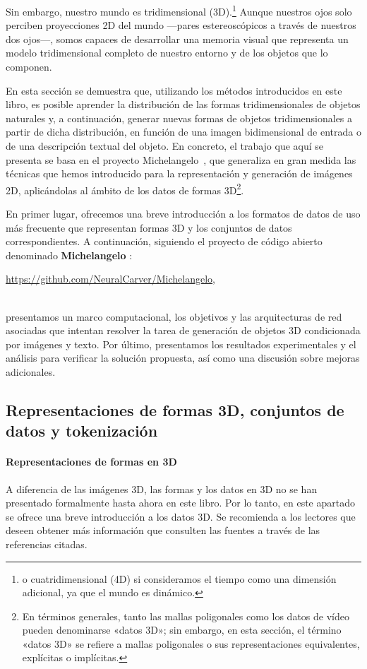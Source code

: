 \documentclass[../../book-main_es.tex]{subfiles}
\begin{document}
Sin embargo, nuestro mundo es tridimensional (3D).\footnote{o
cuatridimensional (4D) si consideramos el tiempo como una dimensión adicional, ya que
el mundo es dinámico.} Aunque nuestros ojos solo perciben proyecciones 2D
del mundo ---pares estereoscópicos a través de nuestros dos ojos---, somos
capaces de desarrollar una memoria visual que representa un modelo tridimensional completo
de nuestro entorno y de los objetos que lo componen.

En esta sección se demuestra que, utilizando los métodos introducidos en este
libro, es posible aprender la distribución de las formas tridimensionales de
objetos naturales y, a continuación, generar nuevas formas de objetos tridimensionales a partir de dicha
distribución, en función de una imagen bidimensional de entrada o de una descripción
textual del objeto. En concreto, el trabajo que aquí se presenta se
basa en el proyecto Michelangelo~\cite{NEURIPS2023_ea1a7f7b}, que
generaliza en gran medida las técnicas que hemos introducido para la representación y generación 
de imágenes 2D, aplicándolas al ámbito de los datos de formas 3D\footnote{En términos generales, 
tanto las mallas poligonales como los datos de vídeo pueden 
denominarse «datos 3D»; sin embargo, en esta sección, el término
«datos 3D» se refiere a mallas poligonales o sus representaciones equivalentes,
explícitas o implícitas.}.

En primer lugar, ofrecemos una breve introducción a los formatos de datos de uso más frecuente que
representan formas 3D y los conjuntos de datos correspondientes. A continuación, siguiendo el
proyecto de código abierto denominado \textbf{Michelangelo}  \cite{NEURIPS2023_ea1a7f7b}:\\
\centerline{\url{https://github.com/NeuralCarver/Michelangelo},}\\
presentamos un marco computacional, los objetivos y las
arquitecturas de red asociadas que intentan resolver la tarea de generación de objetos 3D
condicionada por imágenes y texto. Por último, presentamos
los resultados experimentales y el análisis para verificar la solución propuesta, así
como una discusión sobre mejoras adicionales.

\subsection{Representaciones de formas 3D, conjuntos de datos y tokenización}

\paragraph{Representaciones de formas en 3D}
\label{sec:3D representation}
A diferencia de las imágenes 3D, las formas y los datos en 3D no se han
presentado formalmente hasta ahora en este libro. Por lo tanto, en este
apartado se ofrece una breve introducción a los datos 3D.
Se recomienda a los lectores que deseen obtener más información que consulten
las fuentes a través de las referencias citadas.
\end{document}
